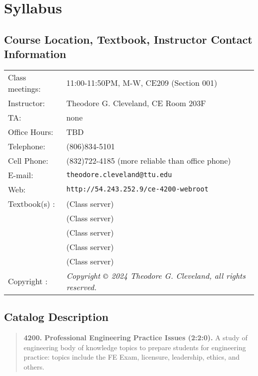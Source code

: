\documentclass[12pt]{article}
\begin{document}
\section*{Syllabus}

\subsection*{{Course Location, Textbook, Instructor Contact Information}}
\begin{tabular}{p{1.5in}p{5.0in}}
Class meetings: &   11:00-11:50PM, M-W, CE209 (Section 001) \\
Instructor: & Theodore G. Cleveland, CE Room 203F \\
TA: & none \\
Office Hours: & TBD \\%
Telephone: & (806)834-5101 \\
Cell Phone: & (832)722-4185 (more reliable than office phone) \\
E-mail: & \texttt{theodore.cleveland@ttu.edu}\\
Web: & \texttt{http://54.243.252.9/ce-4200-webroot}\\
Textbook(s) : & \cite{ASCE2019} (Class server) \\
~ & \cite{NCEES2013} (Class server) \\
~ & \cite{Lindeburg2017} (Class server) \\
~ & \cite{NCEES2020} (Class server)\\
~ & \cite{Cleveland2024} (Class server)\\
Copyright : & \textsl{Copyright $\copyright$ 2024 Theodore G. Cleveland, all rights reserved.} \\
\end{tabular}
\subsection*{{Catalog Description}}
\begin{quote} \textbf{4200.  Professional Engineering Practice Issues (2:2:0).} A study of engineering
body of knowledge topics to prepare students for engineering practice: topics include the FE
Exam, licensure, leadership, ethics, and others.
\end{quote}
\end{document}
